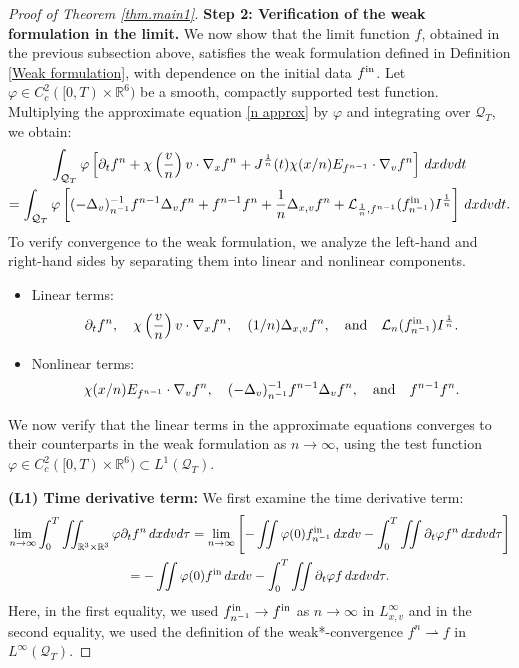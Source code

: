 \documentclass[reqno,11pt,final]{amsart}
\theoremstyle{plain}
\numberwithin{equation}{section}
\numberwithin{theorem}{section}
\begin{document}
\begin{proof}[Proof of Theorem \ref{thm.main1}]
\textbf{Step 2: Verification of the weak formulation in the limit. }We now show that the limit function $f$, obtained in the previous subsection above, satisfies the weak formulation defined in Definition \ref{Weak formulation}, with dependence on the initial data $f^\textup{in}$. Let $\varphi\in C_c^2([0,T)\times\mathbb{R}^6)$ be a smooth, compactly supported test function. Multiplying the approximate equation \eqref{n approx} by $\varphi$ and integrating over $\mathcal{Q}_T$, we obtain:
\begin{multline*}
\int_{\mathcal{Q}_T}\varphi\left[\partial_tf^n + \chi\left(\frac{v}{n}\right)v\cdot\nabla_xf^n + J^{\frac{1}{n}}(t)\chi(x/n)E_{f^{n-1}}\cdot\nabla_vf^n\right]\,dxdvdt\\
=\int_{\mathcal{Q}_T} \varphi\left[(-\Delta_v)_{n^{-1}}^{-1}f^{n-1}\Delta_vf^n + f^{n-1}f^n +\frac{1}{n}\Delta_{x,v}f^n + \mathcal{L}_{\frac{1}{n}, f^{n-1}}(f^\textup{in}_{n^{-1}})I^{\frac{1}{n}}\right]\,dxdvdt.
\end{multline*}To verify convergence to the weak formulation, we analyze the left-hand and right-hand sides by separating them into linear and nonlinear components. 
\begin{itemize}
    \item Linear terms: 
\begin{align*}
\partial_tf^n, \quad \chi\left(\frac{v}{n}\right)v\cdot\nabla_xf^n, \quad (1/n)\Delta_{x,v}f^n, \quad \textup{and} \quad \mathcal{L}_n(f^\textup{in}_{n^{-1}})I^{\frac{1}{n}}.
\end{align*} \item Nonlinear terms: 
\begin{align*}
\chi(x/n)E_{f^{n-1}}\cdot\nabla_v f^n,\quad (-\Delta_v)_{n^{-1}}^{-1}f^{n-1} \Delta_vf^n, \quad \textup{and}\quad  f^{n-1}f^n.
\end{align*}
\end{itemize}
We now verify that the linear terms in the approximate equations converges to their counterparts in the weak formulation as $n\to\infty$, using the test function $\varphi\in C_c^2([0,T)\times\mathbb{R}^6)\subset L^1(\mathcal{Q}_T)$.

\noindent\textbf{(L1) Time derivative term:} We first examine the time derivative term:
\begin{multline*}
\lim_{n\to\infty}\int_0^T \iint_{\mathbb{R}^3\times\mathbb{R}^3}\varphi \partial_tf^n\,dxdvd\tau 
= \lim_{n\to\infty}\left[ - \iint \varphi(0)f^\textup{in}_{n^{-1}}\,dxdv - \int_0^T \iint \partial_t\varphi f^n\,dxdvd\tau\right]\\
= - \iint \varphi(0)f^\textup{in}\,dxdv - \int_0^T \iint \partial_t\varphi f\,dxdvd\tau.
\end{multline*}Here, in the first equality, we used $f^\textup{in}_{n^{-1}}\to f^\textup{in}$ as $n\to\infty$ in $L^\infty_{x,v}$ and in the second equality, we used the definition of the weak*-convergence $f^n \rightharpoonup f$ in $L^\infty(\mathcal{Q}_T)$.


\end{proof}
\end{document}
